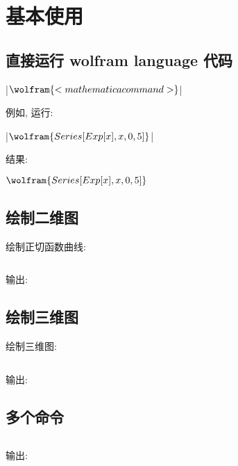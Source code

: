 \section{基本使用}

\subsection{直接运行 wolfram language 代码}

|$\wolfram{<mathematica command>}$|

例如, 
运行:

|$\wolfram{Series[Exp[x],{x,0,5}]}$|

结果:

$\wolfram{Series[Exp[x],{x,0,5}]}$

\subsection{绘制二维图}

绘制正切函数曲线:

\inputminted{latex}{snippets/mathematica/plot2d.tex}

输出:



\subsection{绘制三维图}

绘制三维图:

\inputminted{latex}{snippets/mathematica/plot3d.tex}

输出:



\subsection{多个命令}

\inputminted{latex}{snippets/mathematica/multiplot.tex}

输出:

